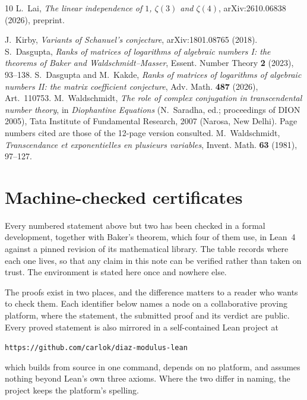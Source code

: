 \documentclass[11pt,a4paper]{article}
\theoremstyle{plain}
\theoremstyle{definition}
\begin{document}
\begin{thebibliography}{10}
 L.~Lai, \emph{The linear independence of $1$, $\zeta(3)$ and $\zeta(4)$}, arXiv:2610.06838 (2026), preprint.

 J.~Kirby, \emph{Variants of Schanuel's conjecture}, arXiv:1801.08765 (2018).
 S.~Dasgupta, \emph{Ranks of matrices of logarithms of algebraic numbers I:
the theorems of Baker and Waldschmidt--Masser}, Essent. Number Theory \textbf{2} (2023), 93--138.
 S.~Dasgupta and M.~Kakde, \emph{Ranks of matrices of logarithms of
algebraic numbers II: the matrix coefficient conjecture}, Adv. Math. \textbf{487} (2026),
Art.~110753.
 M.~Waldschmidt, \emph{The role of complex conjugation in transcendental number theory},
in \emph{Diophantine Equations} (N.~Saradha, ed.; proceedings of DION 2005), Tata Institute of Fundamental
Research, 2007 (Narosa, New Delhi). Page numbers cited are those of the 12-page version consulted.
 M.~Waldschmidt, \emph{Transcendance et exponentielles en plusieurs variables},
Invent. Math. \textbf{63} (1981), 97--127.

\end{thebibliography}



\appendix
\section{Machine-checked certificates}\label{app:certs}

Every numbered statement above but two has been checked in a formal development, together with
Baker's theorem, which four of them use, in Lean~4 against a pinned revision of its mathematical library. The table records where each one lives, so
that any claim in this note can be verified rather than taken on trust. The environment is stated
here once and nowhere else.

The proofs exist in two places, and the difference matters to a reader who wants to check them.
Each identifier below names a node on a collaborative proving platform, where the statement, the
submitted proof and its verdict are public. Every proved statement is also mirrored in a
self-contained Lean project at
\begin{center}\nolinkurl{https://github.com/carlok/diaz-modulus-lean}\end{center}
which builds from source in one command, depends on no platform, and assumes nothing beyond Lean's
own three axioms. Where the two differ in naming, the project keeps the platform's spelling.
\end{document}
